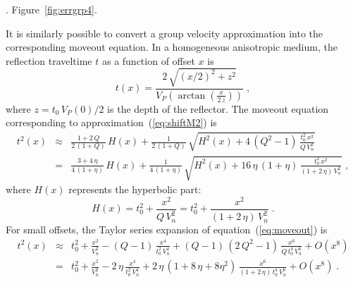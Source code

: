 \cite{GEO65-04-13161325}. 
Figure~\ref{fig:errgrp4}.




It is similarly possible to convert a group velocity approximation into the
corresponding moveout equation. In a homogeneous anisotropic medium, the
reflection traveltime $t$ as a function of offset $x$ is
\begin{equation}
  \label{eq:travel}
  t(x) = \frac{2\,\sqrt{(x/2)^2+z^2}}
  {V_P\left(\arctan\left(\frac{x}{2\,z}\right)\right)}\;,
\end{equation}
where $z = t_0\,V_P(0)/2$ is the depth of the reflector.  The moveout equation
corresponding to approximation~(\ref{eq:shiftM2}) is
\begin{eqnarray}
  \nonumber
  t^2(x) & \approx & \frac{1+2\,Q}{2\,(1+Q)}\,H(x) + 
\frac{1}{2\,(1+Q)}\,
\sqrt{H^2(x) + 4\,(Q^2-1)\,\frac{t_0^2\,x^2}{Q\,V_n^2}} \\
& = & \frac{3+4\,\eta}{4\,(1+\eta)}\,H(x) + 
\frac{1}{4\,(1+\eta)}\,
\sqrt{H^2(x) + 16\,\eta\,(1+\eta)\,\frac{t_0^2\,x^2}{(1+2\,\eta)\,V_n^2}}
\;,
  \label{eq:moveout}
\end{eqnarray}
where
$H(x)$ represents the hyperbolic part:
\begin{equation}
  \label{eq:hyper}
  H(x) = t_0^2 + \frac{x^2}{Q\,V_n^2} = 
  t_0^2 + \frac{x^2}{(1+2\,\eta)\,V_n^2}\;.
\end{equation}
For small offsets, the Taylor series expansion of equation~(\ref{eq:moveout})
is
\begin{eqnarray}
\nonumber
t^2(x) & \approx & t_0^2 + \frac{x^2}{V_n^2} - 
(Q-1)\,\frac{x^4}{t_0^2\,V_n^4} +
(Q-1)\,(2\,Q^2-1)\,\frac{x^6}{Q\,t_0^4\,V_n^6} + O(x^8) \\
& = & t_0^2 + \frac{x^2}{V_n^2} - 2\,\eta\,\frac{x^4}{t_0^2\,V_n^4} +
2\,\eta\,(1+8\,\eta+8\eta^2)\,\frac{x^6}{(1+2\,\eta)\,t_0^4\,V_n^6} + 
O(x^8)\;.
\label{eq:moveout2}  
\end{eqnarray}


